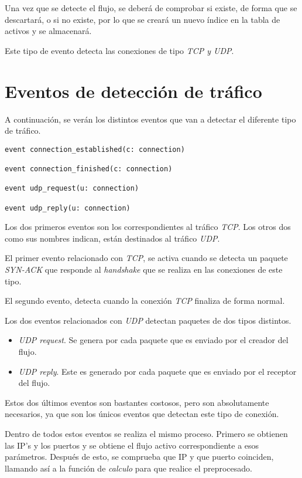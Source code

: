 \intro Una vez que se detecte el flujo, se deberá de comprobar si existe, de forma que se descartará, o si no existe, por lo que se 
creará un nuevo índice en la tabla de activos y se almacenará.

\intro Este tipo de evento detecta las conexiones de tipo \textit{TCP y UDP}.


\section{Eventos de detección de tráfico}
\intro A continuación, se verán los distintos eventos que van a detectar el diferente tipo de tráfico.

\begin{lstlisting}[style=CodigoC]
event connection_established(c: connection)

event connection_finished(c: connection)

event udp_request(u: connection)

event udp_reply(u: connection)

\end{lstlisting}

\intro Los dos primeros eventos son los correspondientes al tráfico \textit{TCP}. Los otros dos como sus nombres indican, están destinados al tráfico \textit{UDP}.

\intro El primer evento relacionado con \textit{TCP}, se activa cuando se detecta un paquete \textit{SYN-ACK} que 
responde al \textit{handshake} que se realiza en las conexiones de este tipo.

\intro El segundo evento, detecta cuando la conexión \textit{TCP} finaliza de forma normal.

\intro Los dos eventos relacionados con \textit{UDP} detectan paquetes de dos tipos distintos.

\begin{itemize}
\item \textit{UDP request}. Se genera por cada paquete que es enviado por el creador del flujo.
\item \textit{UDP reply}. Este es generado por cada paquete que es enviado por el receptor del flujo.
\end{itemize}

\intro Estos dos últimos eventos son bastantes costosos, pero son absolutamente necesarios, ya que son los únicos 
eventos que detectan este tipo de conexión.

\intro Dentro de todos estos eventos se realiza el mismo proceso. Primero se obtienen las IP's y los puertos y se obtiene 
el flujo activo correspondiente a esos parámetros. Después de esto, se comprueba que IP y que puerto coinciden, llamando así a la función de \textit{calculo} para que realice el preprocesado.

